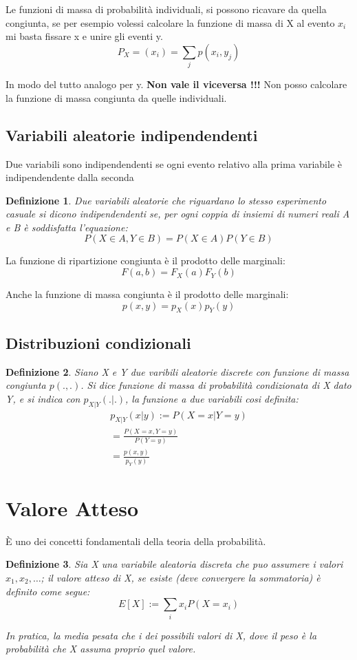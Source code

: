 \documentclass[12pt]{article}
\newtheorem{definition}{Definizione}[section]
\begin{document}
Le funzioni di massa di probabilità individuali, si possono ricavare da 
quella congiunta, se per esempio volessi calcolare la funzione di massa di X
al evento \(x_i\) mi basta fissare x e unire gli eventi y.
\[
P_X =(x_i) = \sum_jp(x_i,y_j)    
\]

In modo del tutto analogo per y. 
\newline
{\bf{Non vale il viceversa !!!}} 
Non posso calcolare la funzione di massa congiunta da quelle individuali.

\subsection{Variabili aleatorie indipendendenti}

Due variabili sono indipendendenti se ogni evento relativo alla prima variabile è indipendendente
dalla seconda

\begin{definition}
    Due variabili aleatorie che riguardano lo stesso esperimento casuale si dicono indipendendenti
    se, per ogni coppia di insiemi di numeri reali A e B è soddisfatta l'equazione: 
    \[
    P(X \in A, Y \in B) = P(X \in A)P(Y \in B)    
    \]
\end{definition}

La funzione di ripartizione congiunta è il prodotto delle marginali:
\[
F(a,b) = F_X(a)F_Y(b)
\]

Anche la funzione di massa congiunta è il prodotto delle marginali: 
\[
p(x,y) = p_X(x)p_Y(y)    
\]

\subsection{Distribuzioni condizionali}

\begin{definition}
    Siano X e Y due varibili aleatorie discrete con funzione di massa congiunta \(p(.,.)\).
    Si dice funzione di massa di probabilità condizionata di X dato Y, e si indica con \(p_{X|Y}(.|.)\),
    la funzione a due variabili cosi definita:
    \begin{align*}
        p_{X|Y}(x|y) := P(X=x|Y=y) \\
        = \frac{P(X=x,Y=y)}{P(Y=y)}   \\
        = \frac{p(x,y)}{p_Y(y)}    
    \end{align*}
\end{definition}

\section{Valore Atteso}
È uno dei concetti fondamentali della teoria della probabilità. 
\begin{definition}
    Sia X una variabile aleatoria discreta che puo assumere i valori \(x_1,x_2,\dots\); il valore 
    atteso di X, se esiste (deve convergere la sommatoria) è definito come segue:
    \[
    E[X] := \sum_{i}x_iP(X = x_i)    
    \]

    In pratica, la media pesata che i dei possibili valori di X, dove il peso è la probabilità
    che X assuma proprio quel valore. 
\end{definition}
\end{document}
